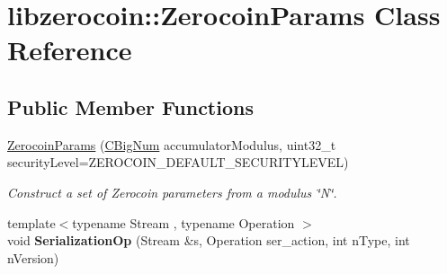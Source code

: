 \hypertarget{classlibzerocoin_1_1_zerocoin_params}{}\section{libzerocoin\+:\+:Zerocoin\+Params Class Reference}
\label{classlibzerocoin_1_1_zerocoin_params}
\subsection*{Public Member Functions}
\begin{DoxyCompactItemize}
\item 
\mbox{\hyperlink{classlibzerocoin_1_1_zerocoin_params_ad7abfc8417e3f07feb7b786cb13c72b0}{Zerocoin\+Params}} (\mbox{\hyperlink{class_c_big_num}{C\+Big\+Num}} accumulator\+Modulus, uint32\+\_\+t security\+Level=Z\+E\+R\+O\+C\+O\+I\+N\+\_\+\+D\+E\+F\+A\+U\+L\+T\+\_\+\+S\+E\+C\+U\+R\+I\+T\+Y\+L\+E\+V\+EL)
\begin{DoxyCompactList}\small\item\em Construct a set of Zerocoin parameters from a modulus \char`\"{}\+N\char`\"{}. \end{DoxyCompactList}\item 
\mbox{\label{classlibzerocoin_1_1_zerocoin_params_ae1b316d1ff232c8f152118c6ae136428}} 
{\footnotesize template$<$typename Stream , typename Operation $>$ }\\void {\bfseries Serialization\+Op} (Stream \&s, Operation ser\+\_\+action, int n\+Type, int n\+Version)
\end{DoxyCompactItemize}
